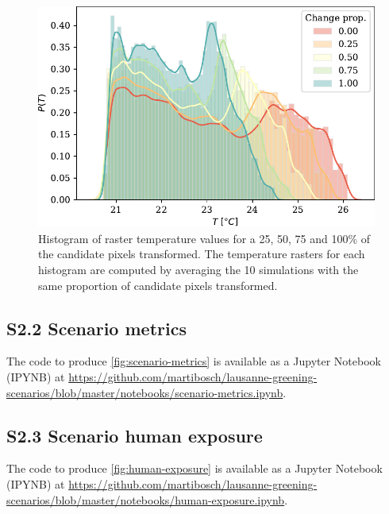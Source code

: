 \documentclass[10pt,letterpaper]{article}
\begin{document}
\begin{figure}[H]
  \centering
  \includegraphics[width=.6\textwidth]{figures/scenario-T-hists}
  \caption{\label{fig:si-scenario-T-hists} Histogram of raster temperature values for a 25, 50, 75 and 100\% of the candidate pixels transformed. The temperature rasters for each histogram are computed by averaging the 10 simulations with the same proportion of candidate pixels transformed.}
\end{figure}


\subsection*{S2.2 Scenario metrics}
\label{sec:si-scenario-metrics}

The code to produce \autoref{fig:scenario-metrics} is available as a Jupyter Notebook (IPYNB) at \url{https://github.com/martibosch/lausanne-greening-scenarios/blob/master/notebooks/scenario-metrics.ipynb}.


\subsection*{S2.3 Scenario human exposure}
\label{sec:si-human-exposure}


The code to produce \autoref{fig:human-exposure} is available as a Jupyter Notebook (IPYNB) at \url{https://github.com/martibosch/lausanne-greening-scenarios/blob/master/notebooks/human-exposure.ipynb}.
\end{document}
